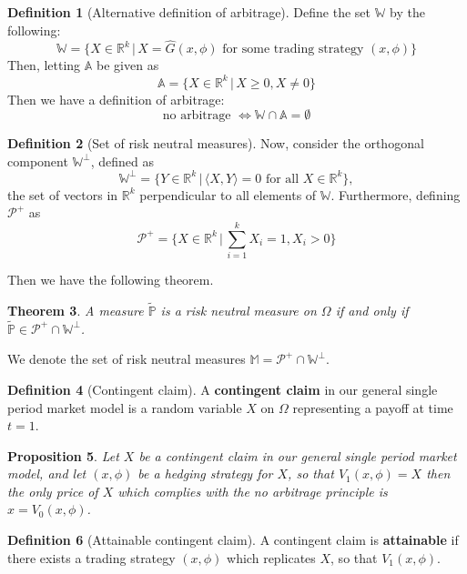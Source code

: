 \documentclass[10pt, oneside, reqno]{amsart}
\theoremstyle{plain}%
\newtheorem{thm}{Theorem}[subsection]
\newtheorem{prop}[thm]{Proposition}
\theoremstyle{definition}
\newtheorem{defn}[thm]{Definition}
\theoremstyle{remark}
\newcommand{\given}{ \, | \,}
\newcommand{\R}{\mathbb{R}}
\newcommand{\rnm}{\tilde{\mathbb{P}}}
\begin{document}
\begin{defn}[Alternative definition of arbitrage]
	Define the set $\mathbb{W}$ by the following:\[
			\mathbb{W} = \{ X \in \R^k \given X = \hat{G}(x,\phi) \text{ for some trading strategy } (x,\phi) \}
		\]
		Then, letting $\mathbb{A}$ be given as \[
			\mathbb{A} = \{ X \in \R^k \given X \geq 0, X \neq 0 \}
		\]
		Then we have a definition of arbitrage:
		\[
			\text{no arbitrage } \iff \mathbb{W} \cap \mathbb{A} = \emptyset
		\]
\end{defn}	

\begin{defn}[Set of risk neutral measures]
	Now, consider the orthogonal component $\mathbb{W}^\perp$, defined as \[
		\mathbb{W}^\perp = \{ Y \in \R^k \given \langle X,Y \rangle = 0 \text{ for all } X \in \R^k \},
	\] the set of vectors in $\R^k$ perpendicular to all elements of $\mathbb{W}$.  Furthermore, defining $\mathcal{P}^+$ as\[
		\mathcal{P}^+  = \{ X \in \R^k \given \sum_{i = 1}^k X_i = 1, X_i > 0 \}
	\] 
\end{defn}
	
	Then we have the following theorem.
	\begin{thm}A measure $\rnm$ is a risk neutral measure on $\Omega$ if and only if $\rnm \in \mathcal{P}^+ \cap \mathbb{W}^\perp$.
	\end{thm}
	
	We denote the set of risk neutral measures $\mathbb{M} = \mathcal{P}^+ \cap \mathbb{W}^\perp$.




\begin{defn}[Contingent claim]
	A \textbf{contingent claim} in our general single period market model is a random variable $X$ on $\Omega$ representing a payoff at time $t = 1$.
\end{defn}

\begin{prop}
	Let $X$ be a contingent claim in our general single period market model, and let $(x,\phi)$ be a hedging strategy for $X$, so that $V_1(x,\phi) = X$ then the only price of $X$ which complies with the no arbitrage principle is $x = V_0(x,\phi)$.
\end{prop}


\begin{defn}[Attainable contingent claim]
	A contingent claim is \textbf{attainable} if there exists a trading strategy $(x,\phi)$ which replicates $X$, so that $V_1(x,\phi)$.
\end{defn}	
\end{document}

